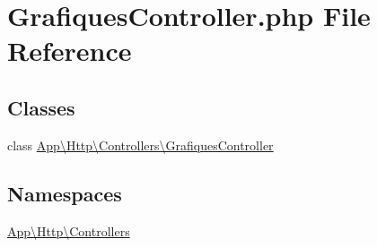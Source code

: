 \hypertarget{_grafiques_controller_8php}{}\section{Grafiques\+Controller.\+php File Reference}
\label{_grafiques_controller_8php}
\subsection*{Classes}
\begin{DoxyCompactItemize}
\item 
class \mbox{\hyperlink{class_app_1_1_http_1_1_controllers_1_1_grafiques_controller}{App\textbackslash{}\+Http\textbackslash{}\+Controllers\textbackslash{}\+Grafiques\+Controller}}
\end{DoxyCompactItemize}
\subsection*{Namespaces}
\begin{DoxyCompactItemize}
\item 
 \mbox{\hyperlink{namespace_app_1_1_http_1_1_controllers}{App\textbackslash{}\+Http\textbackslash{}\+Controllers}}
\end{DoxyCompactItemize}
